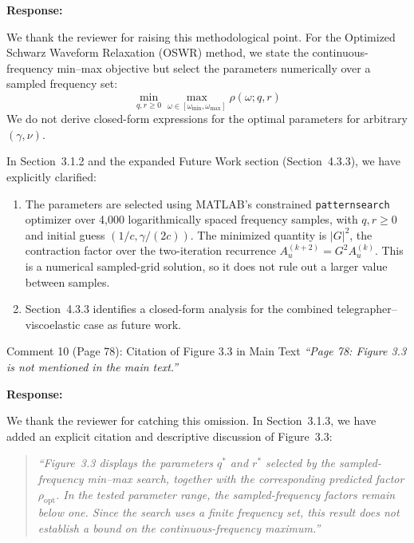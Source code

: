 \documentclass[11pt,a4paper]{article}
\newenvironment{response}{
    \par\vspace{1mm}\noindent\textbf{\textcolor{responseframe}{Response:}}\par\vspace{1mm}
}{
    \par\vspace{3mm}
}
\begin{document}
\begin{response}
We thank the reviewer for raising this methodological point. For the Optimized Schwarz Waveform Relaxation (OSWR) method, we state the continuous-frequency min--max objective but select the parameters numerically over a sampled frequency set:
\[
\min_{q, r \ge 0} \max_{\omega \in [\omega_{\min}, \omega_{\max}]} \rho(\omega; q, r)
\]
We do not derive closed-form expressions for the optimal parameters for arbitrary $(\gamma,\nu)$.

In Section~3.1.2 and the expanded Future Work section (Section~4.3.3), we have explicitly clarified:
\begin{enumerate}[leftmargin=*]
    \item The parameters are selected using MATLAB's constrained \texttt{patternsearch} optimizer over 4,000 logarithmically spaced frequency samples, with $q,r\ge0$ and initial guess $(1/c,\gamma/(2c))$. The minimized quantity is $|G|^2$, the contraction factor over the two-iteration recurrence $A_u^{(k+2)}=G^2A_u^{(k)}$. This is a numerical sampled-grid solution, so it does not rule out a larger value between samples.
    \item Section~4.3.3 identifies a closed-form analysis for the combined telegrapher--viscoelastic case as future work.
\end{enumerate}
\end{response}

\vspace{2mm}
\begin{revcomment}{Comment 10 (Page 78): Citation of Figure 3.3 in Main Text}
\emph{``Page 78: Figure 3.3 is not mentioned in the main text.''}
\end{revcomment}

\begin{response}
We thank the reviewer for catching this omission. In Section~3.1.3, we have added an explicit citation and descriptive discussion of Figure~3.3:
\begin{quote}
    \emph{``Figure~3.3 displays the parameters $q^\ast$ and $r^\ast$ selected by the sampled-frequency min--max search, together with the corresponding predicted factor $\rho_{\mathrm{opt}}$. In the tested parameter range, the sampled-frequency factors remain below one. Since the search uses a finite frequency set, this result does not establish a bound on the continuous-frequency maximum.''}
\end{quote}
\end{response}
\end{document}
